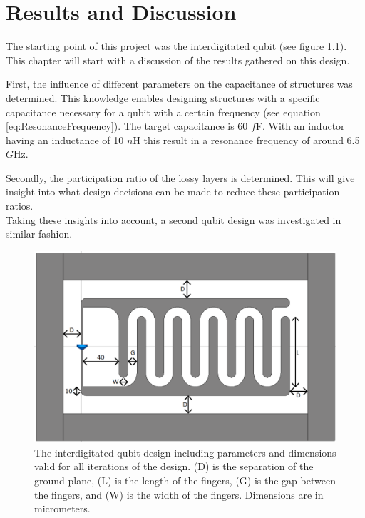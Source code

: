 \chapter{Results and Discussion}
The starting point of this project was the interdigitated qubit (see figure \ref{fig:Yale_parameters2}). This chapter will start with a discussion of the results gathered on this design.


First, the influence of different parameters on the capacitance of structures was determined. This knowledge enables designing structures with a specific capacitance necessary for a qubit with a certain frequency (see equation \eqref{eq:ResonanceFrequency}). The target capacitance is 60 \(f\)F. With an inductor having an inductance of 10 \(n\)H this result in a resonance frequency of around 6.5 \(G\)Hz. 


Secondly, the participation ratio of the lossy layers is determined. This will give insight into what design decisions can be made to reduce these participation ratios.\\
Taking these insights into account, a second qubit design was investigated in similar fashion. 

\vfill

\begin{figure}[h]
	\centering
	\includegraphics[scale = .4]{Figures/Yale_parameters2_cropped}
	\caption{The interdigitated qubit design including parameters and dimensions valid for all iterations of the design. (D) is the separation of the ground plane, (L) is the length of the fingers, (G) is the gap between the fingers, and (W) is the width of the fingers. Dimensions are in micrometers.}
	\label{fig:Yale_parameters2}
\end{figure}

